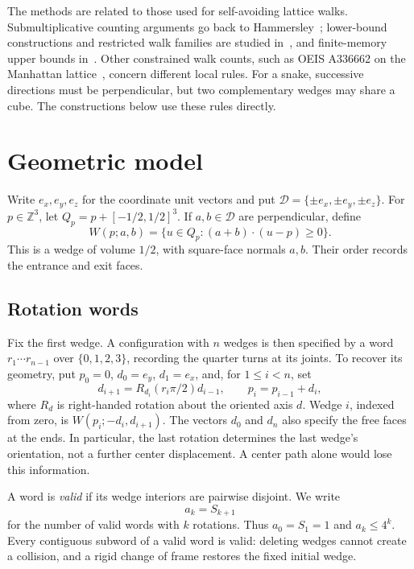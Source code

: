 \documentclass[11pt]{article}
\newcommand{\Z}{\mathbb{Z}}
\begin{document}
The methods are related to those used for self-avoiding lattice walks.
Submultiplicative counting arguments go back to
Hammersley~\cite{hammersley1957}; lower-bound constructions and restricted
walk families are studied in~\cite{hara1993,bacher2011}, and finite-memory
upper bounds in~\cite{alm1993,noonan1998,ponitz2000,he2025}.
Other constrained walk counts, such as OEIS A336662 on the Manhattan
lattice~\cite{oeisA336662}, concern different local rules. For a snake,
successive directions must be perpendicular, but two complementary
wedges may share a cube. The constructions below use these rules
directly.

\section{Geometric model}\label{sec:geometry}

Write $e_x,e_y,e_z$ for the coordinate unit vectors and put
$\mathcal D=\{\pm e_x,\pm e_y,\pm e_z\}$.
For $p\in\Z^3$, let $Q_p=p+[-1/2,1/2]^3$.
If $a,b\in\mathcal D$ are perpendicular, define
\begin{equation}\label{eq:wedge}
 W(p;a,b)=\{u\in Q_p:(a+b)\cdot(u-p)\geq0\}.
\end{equation}
This is a wedge of volume $1/2$, with square-face normals $a,b$.
Their order records the entrance and exit faces.

\subsection{Rotation words}

Fix the first wedge. A configuration with $n$ wedges is then specified
by a word $r_1\cdots r_{n-1}$ over $\{0,1,2,3\}$, recording the
quarter turns at its joints. To recover its geometry, put
$p_0=0$, $d_0=e_y$, $d_1=e_x$, and, for $1\leq i<n$, set
\begin{equation}\label{eq:directions}
 d_{i+1}=R_{d_i}(r_i\pi/2)d_{i-1},\qquad
 p_i=p_{i-1}+d_i,
\end{equation}
where $R_d$ is right-handed rotation about the oriented axis $d$.
Wedge $i$, indexed from zero, is $W(p_i;-d_i,d_{i+1})$.
The vectors $d_0$ and $d_n$ also specify the free faces at the ends.
In particular, the last rotation determines the last wedge's
orientation, not a further center displacement. A center path alone
would lose this information.

A word is \emph{valid} if its wedge interiors are pairwise disjoint.
We write
\[
 a_k=S_{k+1}
\]
for the number of valid words with $k$ rotations. Thus $a_0=S_1=1$
and $a_k\leq4^k$.
Every contiguous subword of a valid word is valid: deleting wedges
cannot create a collision, and a rigid change of frame restores the
fixed initial wedge.
\end{document}
